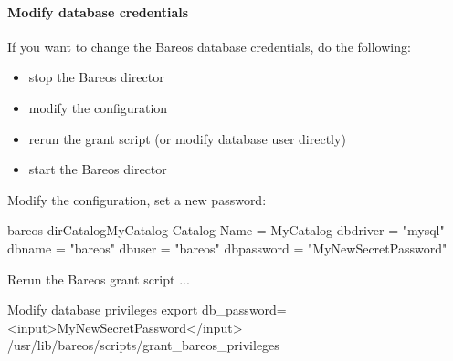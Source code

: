 \paragraph{Modify database credentials}

If you want to change the Bareos database credentials, do the following:

\begin{itemize}
    \item stop the Bareos director
    \item modify the configuration
    \item rerun the grant script  (or modify database user directly)
    \item start the Bareos director
\end{itemize}

Modify the configuration, set a new password:

\begin{bareosConfigResource}{bareos-dir}{Catalog}{MyCatalog}
Catalog {
  Name = MyCatalog
  dbdriver = "mysql"
  dbname = "bareos"
  dbuser = "bareos"
  dbpassword = "MyNewSecretPassword"
}
\end{bareosConfigResource}

Rerun the Bareos grant script  ...

\begin{commands}{Modify database privileges}
export db_password=<input>MyNewSecretPassword</input>
/usr/lib/bareos/scripts/grant_bareos_privileges
\end{commands}


